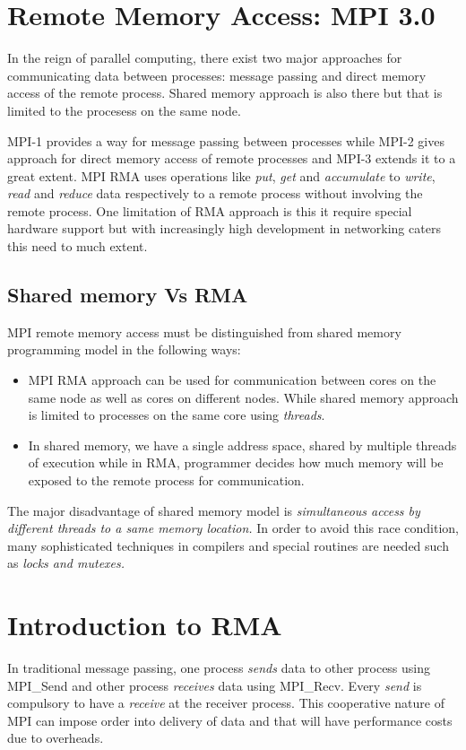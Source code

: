 \documentclass[12pt]{article}
\begin{document}
\section{Remote Memory Access: MPI 3.0}
In the reign of parallel computing, there exist two major approaches for communicating data between processes:
message passing and direct memory access of the remote process. Shared memory approach is also there but that 
is limited to the procesess on the same node. 

MPI-1 provides a way for message passing between processes while MPI-2 gives approach for direct memory access
of remote processes and MPI-3 extends it to a great extent. MPI RMA uses operations like \textit{put}, \textit{get}
and \textit{accumulate} to \textit{write}, \textit{read} and \textit{reduce} data respectively to a remote process 
without involving the remote process. One limitation of RMA approach is this it require special hardware support
but with increasingly high development in networking caters this need to much extent.

\subsection{Shared memory Vs RMA}
MPI remote memory access must be distinguished from shared memory programming model in the following ways:
\begin{itemize}
    \item MPI RMA approach can be used for communication between cores on the same node as well as cores on different
    nodes. While shared memory approach is limited to processes on the same core using \textit{threads}.
    \item In shared memory, we have a single address space, shared by multiple threads of execution while in RMA, programmer
    decides how much memory will be exposed to the remote process for communication. 
\end{itemize}
The major disadvantage of shared memory model is \textit{simultaneous access by different threads to a same memory location.}
In order to avoid this race condition, many sophisticated techniques in compilers and special routines are needed such as 
\textit{locks and mutexes.}

\section{Introduction to RMA}
In traditional message passing, one process \textit{sends} data to other process using {\ttfamily MPI\_Send} and other 
process \textit{receives} data using {\ttfamily MPI\_Recv}. Every \textit{send} is compulsory to have a \textit{receive}
at the receiver process. This cooperative nature of MPI can impose order into delivery of data and that will have 
performance costs due to overheads.
\end{document}
